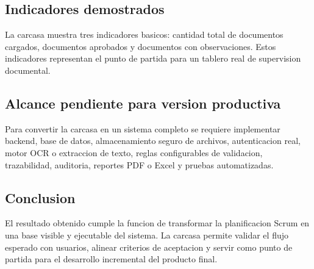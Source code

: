 \documentclass[11pt,letterpaper]{article}
\begin{document}
\subsection*{Indicadores demostrados}

La carcasa muestra tres indicadores basicos: cantidad total de documentos cargados, documentos aprobados y documentos con observaciones. Estos indicadores representan el punto de partida para un tablero real de supervision documental.

\subsection*{Alcance pendiente para version productiva}

Para convertir la carcasa en un sistema completo se requiere implementar backend, base de datos, almacenamiento seguro de archivos, autenticacion real, motor OCR o extraccion de texto, reglas configurables de validacion, trazabilidad, auditoria, reportes PDF o Excel y pruebas automatizadas.

\subsection*{Conclusion}

El resultado obtenido cumple la funcion de transformar la planificacion Scrum en una base visible y ejecutable del sistema. La carcasa permite validar el flujo esperado con usuarios, alinear criterios de aceptacion y servir como punto de partida para el desarrollo incremental del producto final.
\end{document}
